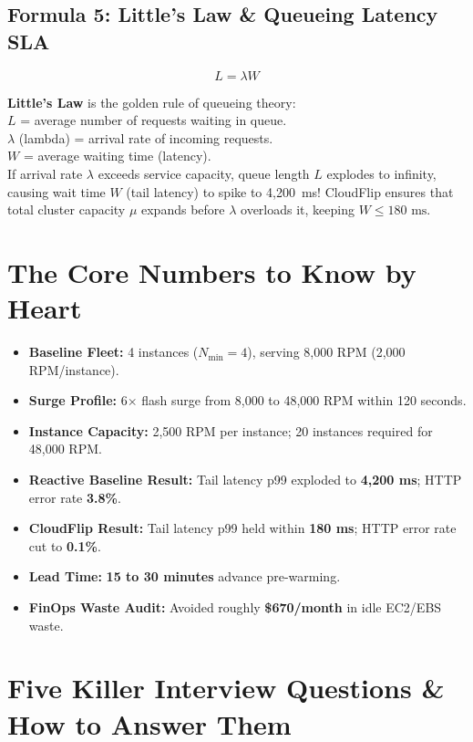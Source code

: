 \documentclass[11pt,letterpaper]{article}
\begin{document}
\subsection{Formula 5: Little's Law \& Queueing Latency SLA}
\begin{equation}
L = \lambda W
\end{equation}
\begin{tcolorbox}[title=Intuition \& Why We Use It]
\textbf{Little's Law} is the golden rule of queueing theory: \\
$L$ = average number of requests waiting in queue. \\
$\lambda$ (lambda) = arrival rate of incoming requests. \\
$W$ = average waiting time (latency). \\
If arrival rate $\lambda$ exceeds service capacity, queue length $L$ explodes to infinity, causing wait time $W$ (tail latency) to spike to 4,200~ms! CloudFlip ensures that total cluster capacity $\mu$ expands before $\lambda$ overloads it, keeping $W \le 180\text{ ms}$.
\end{tcolorbox}

\section{The Core Numbers to Know by Heart}
\begin{itemize}[itemsep=2pt]
  \item \textbf{Baseline Fleet:} 4 instances ($N_{\min}=4$), serving 8,000 RPM (2,000 RPM/instance).
  \item \textbf{Surge Profile:} 6$\times$ flash surge from 8,000 to 48,000 RPM within 120 seconds.
  \item \textbf{Instance Capacity:} 2,500 RPM per instance; 20 instances required for 48,000 RPM.
  \item \textbf{Reactive Baseline Result:} Tail latency p99 exploded to \textbf{4,200 ms}; HTTP error rate \textbf{3.8\%}.
  \item \textbf{CloudFlip Result:} Tail latency p99 held within \textbf{180 ms}; HTTP error rate cut to \textbf{0.1\%}.
  \item \textbf{Lead Time:} \textbf{15 to 30 minutes} advance pre-warming.
  \item \textbf{FinOps Waste Audit:} Avoided roughly \textbf{\$670/month} in idle EC2/EBS waste.
\end{itemize}

\section{Five Killer Interview Questions \& How to Answer Them}
\end{document}
